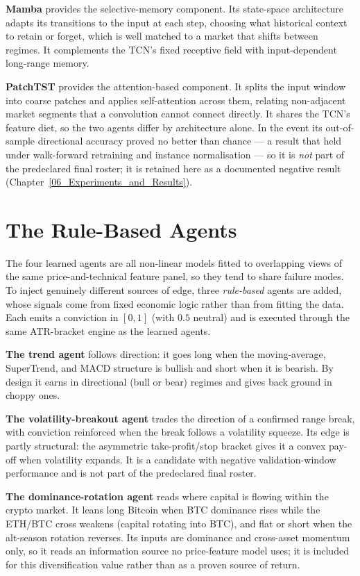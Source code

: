 \textbf{Mamba} provides the selective-memory component. Its state-space architecture adapts its transitions to the input at each step, choosing what historical context to retain or forget, which is well matched to a market that shifts between regimes. It complements the TCN's fixed receptive field with input-dependent long-range memory.


\textbf{PatchTST} provides the attention-based component. It splits the input window into coarse patches and applies self-attention across them, relating non-adjacent market segments that a convolution cannot connect directly. It shares the TCN's feature diet, so the two agents differ by architecture alone. In the event its out-of-sample directional accuracy proved no better than chance --- a result that held under walk-forward retraining and instance normalisation --- so it is \textit{not} part of the predeclared final roster; it is retained here as a documented negative result (Chapter~\ref{06_Experiments_and_Results}).

\section{The Rule-Based Agents}
\label{sec:rule_agents_arch}

The four learned agents are all non-linear models fitted to overlapping views of the same price-and-technical feature panel, so they tend to share failure modes. To inject genuinely different sources of edge, three \textit{rule-based} agents are added, whose signals come from fixed economic logic rather than from fitting the data. Each emits a conviction in $[0,1]$ (with $0.5$ neutral) and is executed through the same ATR-bracket engine as the learned agents.


\textbf{The trend agent} follows direction: it goes long when the moving-average, SuperTrend, and MACD structure is bullish and short when it is bearish. By design it earns in directional (bull or bear) regimes and gives back ground in choppy ones.


\textbf{The volatility-breakout agent} trades the direction of a confirmed range break, with conviction reinforced when the break follows a volatility squeeze. Its edge is partly structural: the asymmetric take-profit/stop bracket gives it a convex pay-off when volatility expands. It is a candidate with negative validation-window performance and is not part of the predeclared final roster.


\textbf{The dominance-rotation agent} reads where capital is flowing within the crypto market. It leans long Bitcoin when BTC dominance rises while the ETH/BTC cross weakens (capital rotating into BTC), and flat or short when the alt-season rotation reverses. Its inputs are dominance and cross-asset momentum only, so it reads an information source no price-feature model uses; it is included for this diversification value rather than as a proven source of return.

